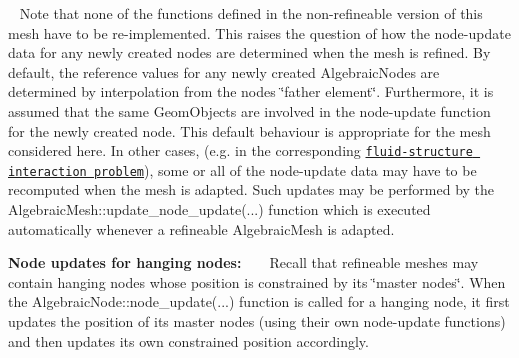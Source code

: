 \begin{DoxyItemize}
\begin{DoxyCodeInclude}
\end{DoxyCodeInclude}
 ~\newline
 Note that none of the functions defined in the non-\/refineable version of this mesh have to be re-\/implemented. This raises the question of how the node-\/update data for any newly created nodes are determined when the mesh is refined. By default, the reference values for any newly created {\ttfamily Algebraic\+Nodes} are determined by interpolation from the node\textquotesingle{}s \char`\"{}father element\char`\"{}. Furthermore, it is assumed that the same {\ttfamily Geom\+Objects} are involved in the node-\/update function for the newly created node. This default behaviour is appropriate for the mesh considered here. In other cases, (e.\+g. in the corresponding \href{../../../interaction/fsi_collapsible_channel_algebraic/html/index.html}{\tt fluid-\/structure interaction problem}), some or all of the node-\/update data may have to be recomputed when the mesh is adapted. Such updates may be performed by the {\ttfamily Algebraic\+Mesh\+::update\+\_\+node\+\_\+update}(...) function which is executed automatically whenever a refineable {\ttfamily Algebraic\+Mesh} is adapted. ~\newline
~\newline

\item {\bfseries Node updates for hanging nodes\+:} ~\newline
 ~\newline
 Recall that refineable meshes may contain hanging nodes whose position is constrained by its \char`\"{}master nodes\char`\"{}. When the {\ttfamily Algebraic\+Node\+::node\+\_\+update}(...) function is called for a hanging node, it first updates the position of its master nodes (using their own node-\/update functions) and then updates its own constrained position accordingly. ~\newline
~\newline


\end{DoxyItemize}
